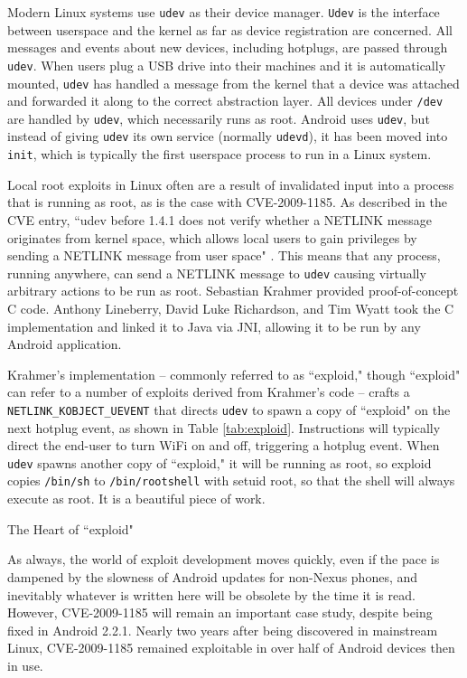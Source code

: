 Modern Linux systems use \texttt{udev} as their device manager.  \texttt{Udev} is the interface between userspace and the kernel as
far as device registration are concerned.  All messages and events about new devices, including hotplugs, are passed through
\texttt{udev}.  When users plug a USB drive into their machines and it is automatically mounted, \texttt{udev} has handled a
message from the kernel that a device was attached and forwarded it along to the correct abstraction layer.  All devices under
\texttt{/dev} are handled by \texttt{udev}, which necessarily runs as root.  Android uses \texttt{udev}, but instead of giving
\texttt{udev} its own service (normally \texttt{udevd}), it has been moved into \texttt{init}, which is typically the first
userspace process to run in a Linux system.

Local root exploits in Linux often are a result of invalidated input into a process that is running as root, as is the case with
CVE-2009-1185.  As described in the CVE entry, ``udev before 1.4.1 does not verify whether a NETLINK message originates from kernel
space, which allows local users to gain privileges by sending a NETLINK message from user space" \cite{udevcve}.  This means that
any process, running anywhere, can send a NETLINK message to \texttt{udev} causing virtually arbitrary actions to be run as root.
Sebastian Krahmer provided proof-of-concept C code.  Anthony Lineberry, David Luke Richardson, and Tim Wyatt
\citeyear{arentpermissions} took the C implementation and linked it to Java via JNI, allowing it to be run by any Android
application.

Krahmer's implementation -- commonly referred to as ``exploid," though ``exploid" can refer to a number of exploits derived from
Krahmer's code -- crafts a \texttt{NETLINK\_KOBJECT\_UEVENT} that directs \texttt{udev} to spawn a copy of ``exploid" on the next
hotplug event, as shown in Table \ref{tab:exploid}.  Instructions will typically direct the end-user to turn WiFi on and off,
triggering a hotplug event.  When \texttt{udev} spawns another copy of ``exploid," it will be running as root, so exploid copies
\texttt{/bin/sh} to \texttt{/bin/rootshell} with setuid root, so that the shell will always execute as root.  It is a beautiful
piece of work.

\begin{table}[htb]

\caption{The Heart of ``exploid"}
\label{tab:exploid}
\end{table}

As always, the world of exploit development moves quickly, even if the pace is dampened by the slowness of Android updates for
non-Nexus phones, and inevitably whatever is written here will be obsolete by the time it is read.  However, CVE-2009-1185 will
remain an important case study, despite being fixed in Android 2.2.1.  Nearly two years after being discovered in mainstream Linux,
CVE-2009-1185 remained exploitable in over half of Android devices then in use.

